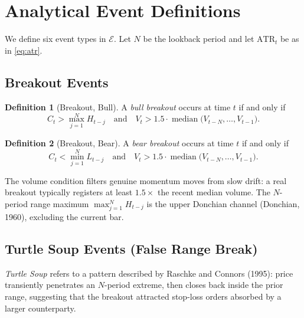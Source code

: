 \documentclass[11pt,a4paper]{article}
\theoremstyle{definition}
\newtheorem{definition}{Definition}[section]
\theoremstyle{plain}
\newcommand{\med}{\operatorname{median}}
\begin{document}
\section{Analytical Event Definitions}
\label{sec:events}

We define six event types in $\mathcal{E}$. Let $N$ be the lookback period
and let $\mathrm{ATR}_t$ be as in \eqref{eq:atr}.

\subsection{Breakout Events}

\begin{definition}[Breakout, Bull]
\label{def:breakout_bull}
A \emph{bull breakout} occurs at time $t$ if and only if
\begin{equation}
    C_t > \max_{j=1}^{N} H_{t-j}
    \quad \text{and} \quad
    V_t > 1.5 \cdot \med\!\bigl(V_{t-N}, \ldots, V_{t-1}\bigr).
    \label{eq:breakout_bull}
\end{equation}
\end{definition}

\begin{definition}[Breakout, Bear]
\label{def:breakout_bear}
A \emph{bear breakout} occurs at time $t$ if and only if
\begin{equation}
    C_t < \min_{j=1}^{N} L_{t-j}
    \quad \text{and} \quad
    V_t > 1.5 \cdot \med\!\bigl(V_{t-N}, \ldots, V_{t-1}\bigr).
    \label{eq:breakout_bear}
\end{equation}
\end{definition}

The volume condition filters genuine momentum moves from slow drift: a real
breakout typically registers at least $1.5\times$ the recent median volume.
The $N$-period range maximum $\max_{j=1}^{N} H_{t-j}$ is the upper
Donchian channel (Donchian, 1960), excluding the current bar.

\subsection{Turtle Soup Events (False Range Break)}

\emph{Turtle Soup} refers to a pattern described by Raschke and Connors
(1995): price transiently penetrates an $N$-period extreme, then closes
back inside the prior range, suggesting that the breakout attracted
stop-loss orders absorbed by a larger counterparty.
\end{document}
